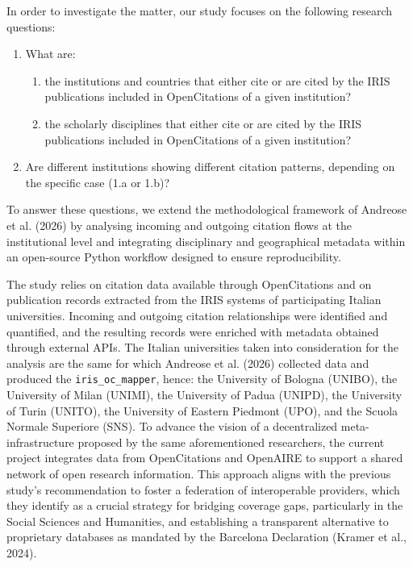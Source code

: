 \documentclass[year=2026]{cup-journal}
\begin{document}
In order to investigate the matter, our study focuses on the following research questions:

\begin{enumerate}   
    \item What are:
    \begin{enumerate}
        \item the institutions and countries that either cite or are cited by the IRIS publications included in OpenCitations of a given institution?
        \item the scholarly disciplines that either cite or are cited by the IRIS publications included in OpenCitations of a given institution?
    \end{enumerate}
    \item Are different institutions showing different citation patterns, depending on the specific case (1.a or 1.b)?
\end{enumerate}

To answer these questions, we extend the methodological framework of Andreose et al. (2026) by analysing incoming and outgoing citation flows at the institutional level and integrating disciplinary and geographical metadata within an open-source Python workflow designed to ensure reproducibility.

The study relies on citation data available through OpenCitations and on publication records extracted from the IRIS systems of participating Italian universities. Incoming and outgoing citation relationships were identified and quantified, and the resulting records were enriched with metadata obtained through external APIs. The Italian universities taken into consideration for the analysis are the same for which Andreose et al. (2026) collected data and produced the \verb|iris_oc_mapper|, hence: the University of Bologna (UNIBO), the University of Milan (UNIMI), the University of Padua (UNIPD), the University of Turin (UNITO), the University of Eastern Piedmont (UPO), and the Scuola Normale Superiore (SNS). To advance the vision of a decentralized meta-infrastructure proposed by the same aforementioned researchers, the current project integrates data from OpenCitations and OpenAIRE to support a shared network of open research information. This approach aligns with the previous study’s recommendation to foster a federation of interoperable providers, which they identify as a crucial strategy for bridging coverage gaps, particularly in the Social Sciences and Humanities, and establishing a transparent alternative to proprietary databases as mandated by the Barcelona Declaration (Kramer et al., 2024).
\end{document}
